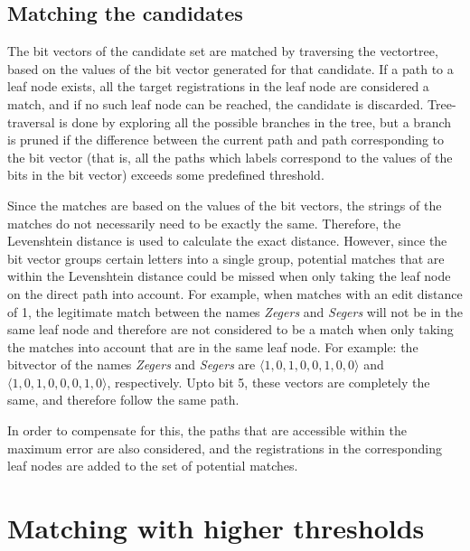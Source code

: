 \subsection{Matching the candidates}
The bit vectors of the candidate set are matched by traversing the vectortree, based on the values of the bit vector generated for that candidate. If a path to a leaf node exists, all the target registrations in the leaf node are considered a match, and if no such leaf node can be reached, the candidate is discarded. Tree-traversal is done by exploring all the possible branches in the tree, but a branch is pruned if the difference between the current path and path corresponding to the bit vector (that is, all the paths which labels correspond to the values of the bits in the bit vector) exceeds some predefined threshold.  
\newline

Since the matches are based on the values of the bit vectors, the strings of the matches do not necessarily need to be exactly the same. Therefore, the Levenshtein distance is used to calculate the exact distance. However, since the bit vector groups certain letters into a single group, potential matches that are within the Levenshtein distance could be missed when only taking the leaf node on the direct path into account. 
For example, when matches with an edit distance of 1, the legitimate match between the names \textit{Zegers} and \textit{Segers} will not be in the same leaf node and therefore are not considered to be a match when only taking the matches into account that are in the same leaf node. For example: the bitvector of the names \textit{Zegers} and \textit{Segers} are $\langle 1, 0, 1, 0, 0, 1, 0, 0\rangle$ and $\langle 1, 0, 1, 0, 0, 0, 1, 0\rangle$, respectively. Upto bit 5, these vectors are completely the same, and therefore follow the same path.
\newline

In order to compensate for this, the paths that are accessible within the maximum error are also considered, and the registrations in the corresponding leaf nodes are added to the set of potential matches.

\section{Matching with higher thresholds}
